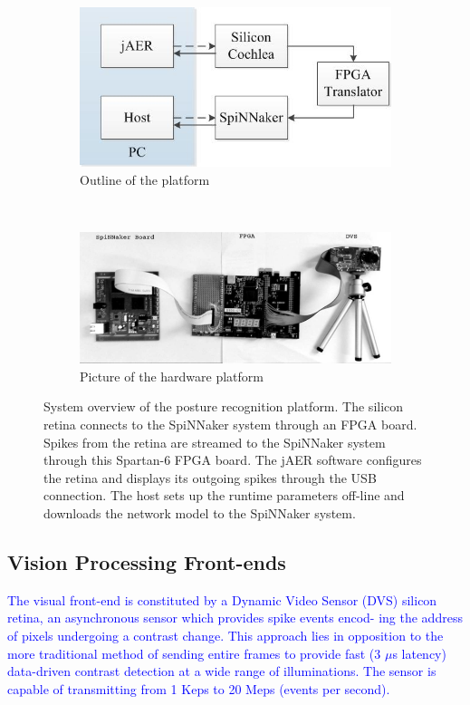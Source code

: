 \begin{figure}
\centering
	\begin{subfigure}[t]{0.6\textwidth}
		\includegraphics[width=\textwidth]{pics/outline.jpg}
	    \caption{Outline of the platform}
	    \label{fig:SysOverViewa}
	\end{subfigure}
	\\
	\begin{subfigure}[t]{0.6\textwidth}
		\includegraphics[width=\textwidth]{pics/dvs_spinnaker.png}	    \caption{Picture of the hardware platform}
	    \label{fig:SysOverViewb}
	\end{subfigure}	

\caption{System overview of the posture recognition platform. The silicon retina connects to the SpiNNaker system through an FPGA board. 
Spikes from the retina are streamed to the SpiNNaker system through this Spartan-6 FPGA board.
The jAER software configures the retina and displays its outgoing spikes through the USB connection.
The host sets up the runtime parameters off-line and downloads the network model to the SpiNNaker system.
}
\label{fig:SysOverView}
\end{figure}

\subsection{Vision Processing Front-ends}
\textcolor{blue}{
The visual front-end is constituted by a Dynamic Video Sensor (DVS) silicon retina, an asynchronous sensor which provides spike events encod-
ing the address of pixels undergoing a contrast change\cite{wei2006robust}. 
This approach lies in opposition to the more traditional method of sending entire frames to provide fast (3 $\mu$s latency) data-driven contrast detection at a wide range of illuminations. 
The sensor is capable of transmitting from 1 Keps to 20 Meps (events per
second).}
